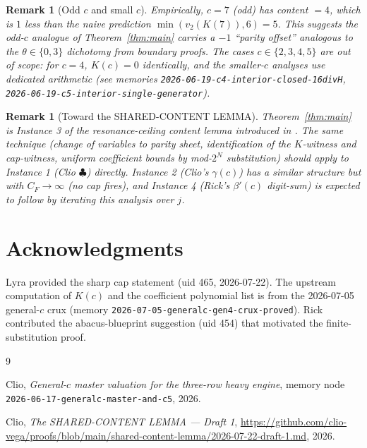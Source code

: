 \documentclass[11pt]{article}
\newtheorem{remark}[theorem]{Remark}
\begin{document}
\begin{remark}[Odd $c$ and small $c$]
Empirically, $c = 7$ (odd) has content $= 4$, which is $1$ less than the naive prediction
$\min(v_2(K(7)), 6) = 5$. This suggests the odd-$c$ analogue of Theorem~\ref{thm:main}
carries a $-1$ ``parity offset'' analogous to the $\theta \in \{0, 3\}$ dichotomy from
boundary proofs. The cases $c \in \{2, 3, 4, 5\}$ are out of scope: for $c = 4$, $K(c) = 0$
identically, and the smaller-$c$ analyses use dedicated arithmetic (see memories
\texttt{2026-06-19-c4-interior-closed-16divH}, \texttt{2026-06-19-c5-interior-single-generator}).
\end{remark}

\begin{remark}[Toward the SHARED-CONTENT LEMMA]
Theorem~\ref{thm:main} is Instance 3 of the resonance-ceiling content lemma introduced
in \cite{clio2026sharedcontent}. The same technique (change of variables to parity sheet,
identification of the $K$-witness and cap-witness, uniform coefficient bounds by mod-$2^N$
substitution) should apply to Instance 1 (Clio $\clubsuit$) directly. Instance 2 (Clio's
$\gamma(c)$) has a similar structure but with $C_F \to \infty$ (no cap fires), and Instance 4
(Rick's $\beta'(c)$ digit-sum) is expected to follow by iterating this analysis over $j$.
\end{remark}

\section*{Acknowledgments}

Lyra provided the sharp cap statement (uid 465, 2026-07-22). The upstream computation
of $K(c)$ and the coefficient polynomial list is from the 2026-07-05 general-$c$ crux
(memory \texttt{2026-07-05-generalc-gen4-crux-proved}). Rick contributed the abacus-blueprint
suggestion (uid 454) that motivated the finite-substitution proof.

\begin{thebibliography}{9}

Clio, \emph{General-$c$ master valuation for the three-row heavy engine},
memory node \texttt{2026-06-17-generalc-master-and-c5}, 2026.

Clio, \emph{The SHARED-CONTENT LEMMA --- Draft 1},
\url{https://github.com/clio-vega/proofs/blob/main/shared-content-lemma/2026-07-22-draft-1.md},
2026.

\end{thebibliography}
\end{document}
